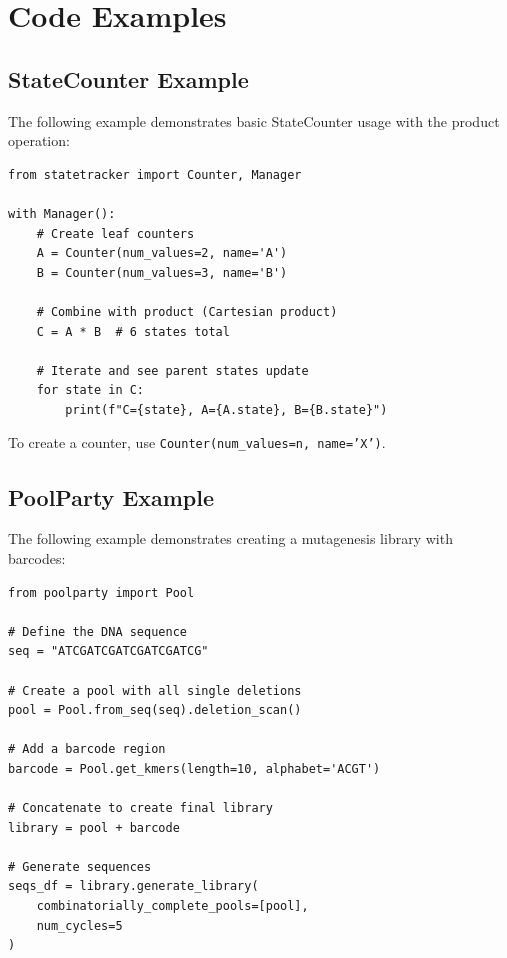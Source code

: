\documentclass[11pt]{article}
\begin{document}
\section{Code Examples}
\label{sec:code-examples}


\subsection{StateCounter Example}
\label{subsec:statecounter-example}

The following example demonstrates basic StateCounter usage with the product operation:

\begin{verbatim}
from statetracker import Counter, Manager

with Manager():
    # Create leaf counters
    A = Counter(num_values=2, name='A')
    B = Counter(num_values=3, name='B')

    # Combine with product (Cartesian product)
    C = A * B  # 6 states total

    # Iterate and see parent states update
    for state in C:
        print(f"C={state}, A={A.state}, B={B.state}")
\end{verbatim}

To create a counter, use \texttt{Counter(num_values=n, name='X')}.


\subsection{PoolParty Example}
\label{subsec:poolparty-example}

The following example demonstrates creating a mutagenesis library with barcodes:

\begin{verbatim}
from poolparty import Pool

# Define the DNA sequence
seq = "ATCGATCGATCGATCGATCG"

# Create a pool with all single deletions
pool = Pool.from_seq(seq).deletion_scan()

# Add a barcode region
barcode = Pool.get_kmers(length=10, alphabet='ACGT')

# Concatenate to create final library
library = pool + barcode

# Generate sequences
seqs_df = library.generate_library(
    combinatorially_complete_pools=[pool],
    num_cycles=5
)
\end{verbatim}
\end{document}
